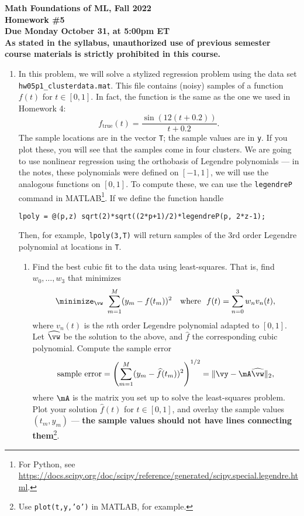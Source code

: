 \documentclass[11pt]{article}
\begin{document}

\noindent
{\bf\large Math Foundations of ML, Fall 2022} \\[3mm]
{\bf\large Homework \#5} \\[3mm]
{\bf Due Monday October 31, at 5:00pm ET}\\[3mm]

{\bf As stated in the syllabus, unauthorized use of previous semester course materials is strictly prohibited in this course.}

\begin{enumerate}

\item In this problem, we will solve a stylized regression problem using the data set \\
\texttt{hw05p1\_clusterdata.mat}.  This file contains  (noisy) samples of a function $f(t)$ for $t\in[0,1]$.  In fact, the function is the same as the one we used in Homework 4:
\[
		f_{\mathrm{true}}(t) = \frac{\sin(12(t+0.2))}{t+0.2}.
\]
The sample locations are in the vector \texttt{T}; the sample values are in \texttt{y}.  If you plot these, you will see that the samples come in four clusters.  We are going to use nonlinear regression using the orthobasis of Legendre polynomials --- in the notes, these polynomials were defined on $[-1,1]$, we will use the analogous functions on $[0,1]$.  To compute these, we can use the \texttt{legendreP} command in MATLAB\footnote{For Python, see \url{https://docs.scipy.org/doc/scipy/reference/generated/scipy.special.legendre.html}.}.  If we define the function handle
\begin{verbatim}
lpoly = @(p,z) sqrt(2)*sqrt((2*p+1)/2)*legendreP(p, 2*z-1);
\end{verbatim}
Then, for example, \texttt{lpoly(3,T)} will return samples of the 3rd order Legendre polynomial at locations in \texttt{T}. 
\begin{enumerate}
	
	\item Find the best cubic fit to the data using least-squares.  That is, find $w_0,\ldots,w_3$ that minimizes
	\[
		\minimize_{\vw}~\sum_{m=1}^M(y_m-f(t_m))^2
		\quad\text{where}~~f(t) = \sum_{n=0}^{3}w_nv_n(t),
	\]
	where $v_n(t)$ is the $n$th order Legendre polynomial adapted to $[0,1]$.
	Let $\widehat\vw$ be the solution to the above, and $\widehat f$ the corresponding cubic polynomial.  Compute the sample error
	\[
		\text{sample error} = \left(\sum_{m=1}^M(y_m-\widehat f(t_m))^2\right)^{1/2} = \|\vy-\mA\widehat\vw\|_2,
	\]
	where $\mA$ is the matrix you set up to solve the least-squares problem.  Plot your solution $\widehat{f}(t)$ for $t\in[0,1]$, and overlay the sample values $(t_m,y_m)$ --- \textbf{the sample values should not have lines connecting them}\footnote{Use \texttt{plot(t,y,'o')} in MATLAB, for example.}.
	

\end{enumerate}
\end{enumerate}
\end{document}
